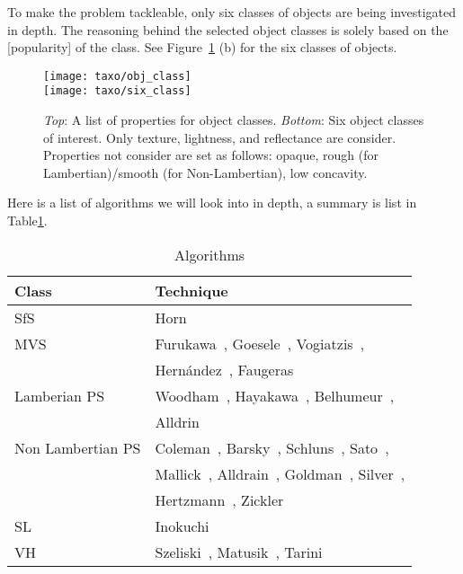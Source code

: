 To make the problem tackleable, only six classes of objects are being investigated in depth. The reasoning behind the selected object classes is solely based on the [popularity] of the class. See Figure~\ref{fig:obj_class} (b) for the six classes of objects.
\begin{figure}[!htbp]
\centering
\texttt{[image: taxo/obj\_class]}\\
\texttt{[image: taxo/six\_class]}\\
\caption{\textit{Top}: A list of properties for object classes. \textit{Bottom}: Six object classes of interest. Only texture, lightness, and reflectance are consider. Properties not consider are set as follows: opaque, rough (for Lambertian)/smooth (for Non-Lambertian), low concavity.}
\label{fig:obj_class}
\end{figure}

Here is a list of algorithms we will look into in depth, a summary is list in Table\ref{tab:class_algo}.
\begin{table}[!ht]
  \centering
  \begin{tabular}{l||l}
  \hline
  \textbf{Class} & \textbf{Technique}\\
  \hline
  SfS & Horn~\cite{horn1970shape}\\
  MVS & Furukawa~\cite{furukawa2010accurate}, Goesele~\cite{goesele2006multi}, Vogiatzis~\cite{vogiatzis2007multiview}, \\
      & Hern{\'a}ndez~\cite{esteban2004silhouette}, Faugeras~\cite{faugeras2002variational}\\
  Lamberian PS & Woodham~\cite{woodham1980photometric}, Hayakawa~\cite{hayakawa1994photometric}, Belhumeur~\cite{belhumeur1999bas}, \\
      & Alldrin~\cite{alldrin2007resolving}\\
  Non Lambertian PS & Coleman~\cite{coleman1982obtaining}, Barsky~\cite{barsky20034}, Schluns~\cite{schluns1993photometric}, Sato~\cite{sato1994temporal}, \\
      & Mallick~\cite{mallick2005beyond}, Alldrain~\cite{alldrin2008photometric}, Goldman~\cite{goldman2010shape}, Silver~\cite{silver1980determining}, \\
      & Hertzmann~\cite{hertzmann2005example}, Zickler~\cite{zickler2002helmholtz}\\
  SL & Inokuchi~\cite{inokuchi1984range}\\
  VH & Szeliski~\cite{szeliski1993rapid}, Matusik~\cite{matusik2002efficient}, Tarini~\cite{tarini2002marching}\\
  \hline
  \end{tabular}
  \caption{Algorithms}
  \label{tab:class_algo}
\end{table}

